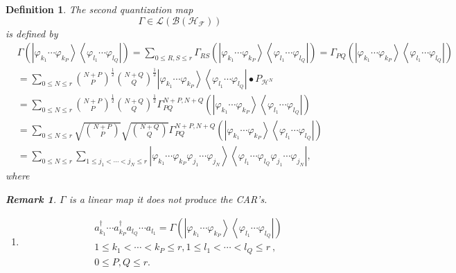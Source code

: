 \documentclass[aps,preprint]{revtex4}%
\newtheorem{definition}[theorem]{Definition}
\newtheorem{remark}[theorem]{Remark}
\begin{document}
\begin{definition}
The second quantization map
\begin{equation}
\Gamma\in\mathcal{L}\left(  \mathcal{B}\left(  \mathcal{H}_{\mathcal{F}%
}\right)  \right)
\end{equation}
is defined by
\begin{align}
&  \Gamma\left(  \left\vert \varphi_{k_{1}}\cdots\varphi_{k_{P}}\right\rangle
\left\langle \varphi_{l_{1}}\cdots\varphi_{l_{Q}}\right\vert \right)
=\sum_{0\leq R,S\leq r}\Gamma_{RS}\left(  \left\vert \varphi_{k_{1}}%
\cdots\varphi_{k_{P}}\right\rangle \left\langle \varphi_{l_{1}}\cdots
\varphi_{l_{Q}}\right\vert \right)  =\Gamma_{PQ}\left(  \left\vert
\varphi_{k_{1}}\cdots\varphi_{k_{P}}\right\rangle \left\langle \varphi_{l_{1}%
}\cdots\varphi_{l_{Q}}\right\vert \right) \\
&  =\sum_{0\leq N\leq r}\binom{N+P}{P}^{\frac{1}{2}}\binom{N+Q}{Q}^{\frac
{1}{2}}\left\vert \varphi_{k_{1}}\cdots\varphi_{k_{P}}\right\rangle
\left\langle \varphi_{l_{1}}\cdots\varphi_{l_{Q}}\right\vert \bullet
P_{\mathcal{H}^{N}}\\
&  =\sum_{0\leq N\leq r}\binom{N+P}{P}^{\frac{1}{2}}\binom{N+Q}{Q}^{\frac
{1}{2}}\Gamma_{PQ}^{N+P,N+Q}\left(  \left\vert \varphi_{k_{1}}\cdots
\varphi_{k_{P}}\right\rangle \left\langle \varphi_{l_{1}}\cdots\varphi_{l_{Q}%
}\right\vert \right) \\
&  =\sum_{0\leq N\leq r}\sqrt{\binom{N+P}{P}}\sqrt{\binom{N+Q}{Q}}\Gamma
_{PQ}^{N+P,N+Q}\left(  \left\vert \varphi_{k_{1}}\cdots\varphi_{k_{P}%
}\right\rangle \left\langle \varphi_{l_{1}}\cdots\varphi_{l_{Q}}\right\vert
\right) \\
&  =\sum_{0\leq N\leq r}\sum_{1\leq j_{1}<\cdots<j_{N}\leq r}\left\vert
\varphi_{k_{1}}\cdots\varphi_{k_{P}}\varphi_{j_{1}}\cdots\varphi_{j_{N}%
}\right\rangle \left\langle \varphi_{l_{1}}\cdots\varphi_{l_{Q}}\varphi
_{j_{1}}\cdots\varphi_{j_{N}}\right\vert ,
\end{align}
where

\begin{remark}
$\Gamma$ is a linear map it does not produce the CAR's.
\end{remark}

\begin{enumerate}
\item
\begin{gather}
a_{k_{1}}^{\dagger}\cdots a_{k_{P}}^{\dagger}a_{l_{Q}}\cdots a_{l_{1}}%
=\Gamma\left(  \left\vert \varphi_{k_{1}}\cdots\varphi_{k_{P}}\right\rangle
\left\langle \varphi_{l_{1}}\cdots\varphi_{l_{Q}}\right\vert \right) \\
1\leq k_{1}<\cdots<k_{P}\leq r,1\leq l_{1}<\cdots<l_{Q}\leq r\ ,\\
0\leq P,Q\leq r.
\end{gather}



\end{enumerate}
\end{definition}
\end{document}
